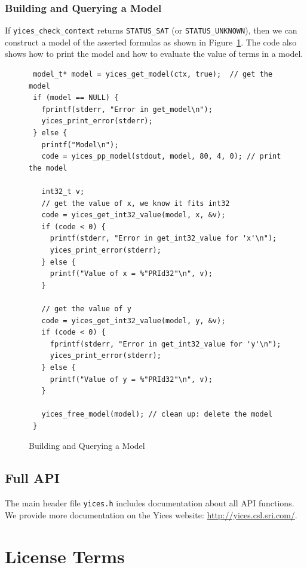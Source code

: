 \documentclass[11pt,twoside,fleqn,openright,titlepage]{cslreport}
\begin{document}
\subsection*{Building and Querying a Model}

If \texttt{yices\_check\_context} returns \texttt{STATUS\_SAT} (or
\texttt{STATUS\_UNKNOWN}), then we can construct a model of the
asserted formulas as shown in Figure~\ref{model-query}. The code also
shows how to print the model and how to evaluate the value of terms in
a model.

\begin{figure}
\begin{footnotesize}
\begin{verbatim}
 model_t* model = yices_get_model(ctx, true);  // get the model
 if (model == NULL) {
   fprintf(stderr, "Error in get_model\n");
   yices_print_error(stderr);
 } else {
   printf("Model\n");
   code = yices_pp_model(stdout, model, 80, 4, 0); // print the model

   int32_t v;
   // get the value of x, we know it fits int32
   code = yices_get_int32_value(model, x, &v);
   if (code < 0) {
     printf(stderr, "Error in get_int32_value for 'x'\n");
     yices_print_error(stderr);
   } else {
     printf("Value of x = %"PRId32"\n", v);
   }

   // get the value of y
   code = yices_get_int32_value(model, y, &v);
   if (code < 0) {
     fprintf(stderr, "Error in get_int32_value for 'y'\n");
     yices_print_error(stderr);
   } else {
     printf("Value of y = %"PRId32"\n", v);
   }

   yices_free_model(model); // clean up: delete the model
 }
\end{verbatim}
\end{footnotesize}
\caption{Building and Querying a Model}
\label{model-query}
\end{figure}


\section{Full API}

The main header file \texttt{yices.h} includes documentation about all
API functions. We provide more documentation on the Yices website:
\url{http://yices.csl.sri.com/}.

\newpage



\appendix
\chapter{License Terms}
\label{license}
\end{document}
